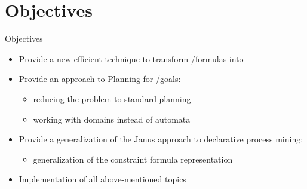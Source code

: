 \documentclass[10pt]{beamer}
\begin{document}
\section{Objectives}
\begin{frame}{Objectives}
\begin{itemize}
	\item Provide a new efficient technique to transform \LTLf/\PLTL formulas into \DFAs		
	\vskip 0.5cm
	\item Provide an approach to \FOND Planning for \LTLf/\PLTL goals:
		\begin{itemize}
			\item 	reducing the problem to standard \FOND planning
			\item 	working with \FOND domains instead of automata
		\end{itemize}
	
	\vskip 0.5cm
	\item Provide a generalization of the Janus approach to declarative process mining:
			\begin{itemize}
				\item 	generalization of the constraint formula representation
			\end{itemize}	
		
	\vskip 0.5cm	
	\item Implementation of all above-mentioned topics

\end{itemize}
\end{frame}
\end{document}
